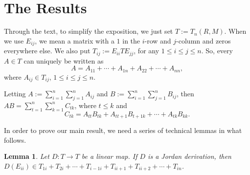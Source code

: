 \documentclass[12pt, reqno]{amsart}
\newtheorem{lemma}[theorem]{Lemma}
\theoremstyle{definition}
\numberwithin{equation}{section}
\begin{document}
\section{\textbf{The Results}}

Through the text, to simplify the exposition, we just set $T:=T_n(R,M)$. When we use $E_{ij}$, we mean a matrix with a $1$ in the $i$-row and $j$-column and zeros everywhere else. We also put $T_{ij}:=E_{ii}TE_{jj}$, for any $1\leq i\leq j\leq n$. So, every $A\in T$ can uniquely be written as $$A=A_{11}+\cdots+ A_{1n}+A_{22}+\cdots+A_{nn},$$ where $A_{ij}\in T_{ij}$, $1\leq i\leq j\leq n$.

\medskip

Letting $A:=\sum_{i=1}^n\sum_{j=1}^nA_{ij}$ and $B:=\sum_{i=1}^n\sum_{j=1}^nB_{ij}$, then $AB=\sum_{t=1}^n\sum_{k=1}^nC_{tk}$, where $t\leq k$ and $$C_{tk}=A_{tt}B_{tk}+A_{tt+1}B_{t+1k}+\cdots+A_{tk}B_{kk}.$$


In order to prove our main result, we need a series of technical lemmas in what follows.

\begin{lemma}\label{1} Let $D : T \longrightarrow T$ be a linear map. If  $D$ is a Jordan derivation, then
$D(E_{ii})\in T_{1i} + T_{2i}+\cdots + T_{i-1i} + T_{ii+1}+T_{ii+2} + \cdots +T_{in}$.
 \end{lemma}
\end{document}
